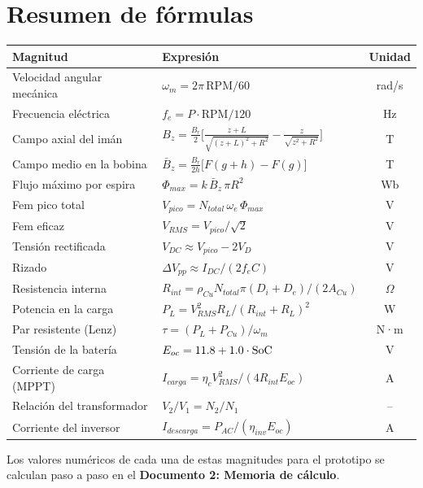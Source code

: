 \documentclass[11pt]{article}
\begin{document}
\section{Resumen de fórmulas}
\begin{table}[H]
\centering
\renewcommand{\arraystretch}{1.6}
\begin{tabular}{p{5.2cm}p{7.6cm}c}
\toprule
Magnitud & Expresión & Unidad\\
\midrule
Velocidad angular mecánica & $\omega_m=2\pi\,\text{RPM}/60$ & rad/s\\
Frecuencia eléctrica & $f_e=P\cdot\text{RPM}/120$ & Hz\\
Campo axial del imán & $B_z=\frac{B_r}{2}\Big[\frac{z+L}{\sqrt{(z+L)^2+R^2}}-\frac{z}{\sqrt{z^2+R^2}}\Big]$ & T\\
Campo medio en la bobina & $\bar B_z=\frac{B_r}{2h}\big[F(g+h)-F(g)\big]$ & T\\
Flujo máximo por espira & $\Phi_{max}=k\,\bar B_z\,\pi R^2$ & Wb\\
Fem pico total & $V_{pico}=N_{total}\,\omega_e\,\Phi_{max}$ & V\\
Fem eficaz & $V_{RMS}=V_{pico}/\sqrt2$ & V\\
Tensión rectificada & $V_{DC}\approx V_{pico}-2V_D$ & V\\
Rizado & $\Delta V_{pp}\approx I_{DC}/(2f_eC)$ & V\\
Resistencia interna & $R_{int}=\rho_{Cu}N_{total}\pi(D_i+D_e)/(2A_{Cu})$ & $\Omega$\\
Potencia en la carga & $P_L=V_{RMS}^2R_L/(R_{int}+R_L)^2$ & W\\
Par resistente (Lenz) & $\tau=(P_L+P_{Cu})/\omega_m$ & N·m\\
Tensión de la batería & $E_{oc}=11.8+1.0\cdot\text{SoC}$ & V\\
Corriente de carga (MPPT) & $I_{carga}=\eta_cV_{RMS}^2/(4R_{int}E_{oc})$ & A\\
Relación del transformador & $V_2/V_1=N_2/N_1$ & --\\
Corriente del inversor & $I_{descarga}=P_{AC}/(\eta_{inv}E_{oc})$ & A\\
\bottomrule
\end{tabular}
\end{table}

Los valores numéricos de cada una de estas magnitudes para el prototipo se calculan paso a paso en el
\textbf{Documento 2: Memoria de cálculo}.
\end{document}

